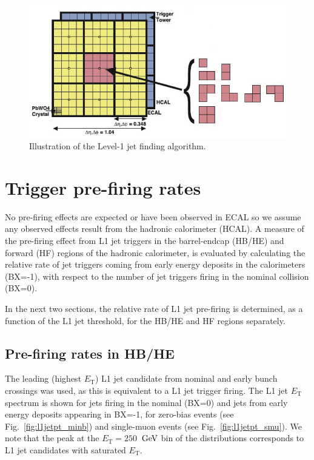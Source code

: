 \documentclass[11pt]{cmspaperpdf}
\newcommand{\GeV}{\ensuremath{\,\text{Ge\hspace{-.08em}V}}\xspace}
\newcommand{\et}{\ensuremath{E_{\textrm{T}}}\xspace}
\begin{document}
\begin{figure}[h!]
\centering
\includegraphics[scale=1.0]{plots/L1JetAlgorithm.png}
\caption{Illustration of the Level-1 jet finding algorithm.}
\label{fig:l1jetalgo}
\end{figure}
\vspace{5mm}

\section{Trigger pre-firing rates}

No pre-firing effects are expected or have been observed in ECAL so we assume any observed effects result from the hadronic calorimeter (HCAL). A measure of the pre-firing effect from L1 jet triggers in the barrel-endcap (HB/HE) and forward (HF) regions of the hadronic calorimeter, is evaluated by calculating the relative rate of jet triggers coming from early energy deposits in the calorimeters (BX=-1), with respect to the number of jet triggers firing in the nominal collision (BX=0). 

In the next two sections, the relative rate of L1 jet pre-firing is determined, as a function of the L1 jet threshold, for the HB/HE and HF regions separately.

\subsection{Pre-firing rates in HB/HE}
\label{sec:rates_hbhe}

The leading (highest \et) L1 jet candidate from nominal and early bunch crossings was used, as this is equivalent to a L1 jet trigger firing. The L1 jet \et spectrum is shown for jets firing in the nominal (BX=0) and jets from early energy deposits appearing in BX=-1, for zero-bias events (see Fig.~\ref{fig:l1jetpt_minb}) and single-muon events (see Fig.~\ref{fig:l1jetpt_smu}). We note that the peak at the $\et=250$ \GeV bin of the distributions corresponds to L1 jet candidates with saturated \et. 
\end{document}
